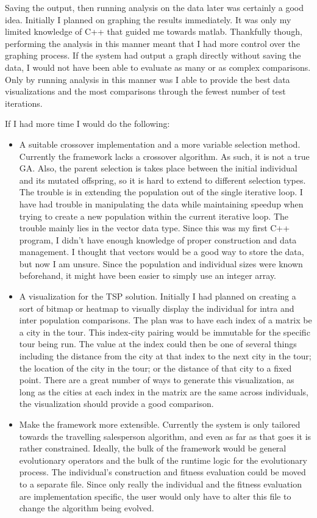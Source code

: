 \documentclass[10pt,letterpaper]{article}
\begin{document}
Saving the output, then running analysis on the data later was certainly a good idea. Initially I planned on graphing the results immediately. It was only my limited knowledge of C++ that guided me towards matlab. Thankfully though, performing the analysis in this manner meant that I had more control over the graphing process. If the system had output a graph directly without saving the data, I would not have been able to evaluate as many or as complex comparisons. Only by running analysis in this manner was I able to provide the best data visualizations and the most comparisons through the fewest number of test iterations.

If I had more time I would do the following:
\begin{itemize}
\item A suitable crossover implementation and a more variable selection method. Currently the framework lacks a crossover algorithm. As such, it is not a true GA. Also, the parent selection is takes place between the initial individual and its mutated offspring, so it is hard to extend to different selection types. The trouble is in extending the population out of the single iterative loop. I have had trouble in manipulating the data while maintaining speedup when trying to create a new population within the current iterative loop. The trouble mainly lies in the vector data type. Since this was my first C++ program, I didn't have enough knowledge of proper construction and data management. I thought that vectors would be a good way to store the data, but now I am unsure. Since the population and individual sizes were known beforehand, it might have been easier to simply use an integer array.
\item A visualization for the TSP solution. Initially I had planned on creating a sort of bitmap or heatmap to visually display the individual for intra and inter population comparisons. The plan was to have each index of a matrix be a city in the tour. This index-city pairing would be immutable for the specific tour being run. The value at the index could then be one of several things including the distance from the city at that index to the next city in the tour; the location of the city in the tour; or the distance of that city to a fixed point. There are a great number of ways to generate this visualization, as long as the cities at each index in the matrix are the same across individuals, the visualization should provide a good comparison.
\item Make the framework more extensible. Currently the system is only tailored towards the travelling salesperson algorithm, and even as far as that goes it is rather constrained. Ideally, the bulk of the framework would be general evolutionary operators and the bulk of the runtime logic for the evolutionary process. The individual's construction and fitness evaluation could be moved to a separate file. Since only really the individual and the fitness evaluation are implementation specific, the user would only have to alter this file to change the algorithm being evolved.

\end{itemize}
\end{document}
